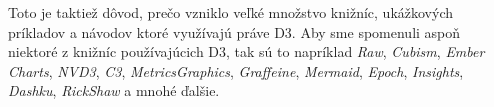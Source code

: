 Toto je taktiež dôvod, prečo vzniklo veľké množstvo knižníc, ukážkových príkladov a návodov ktoré využívajú práve D3. Aby sme spomenuli aspoň niektoré z knižníc používajúcich D3, tak sú to napríklad \textit{Raw}, \textit{Cubism}, \textit{Ember Charts}, \textit{NVD3}, \textit{C3}, \textit{MetricsGraphics}, \textit{Graffeine}, \textit{Mermaid}, \textit{Epoch}, \textit{Insights}, \textit{Dashku}, \textit{RickShaw} a mnohé ďalšie. 